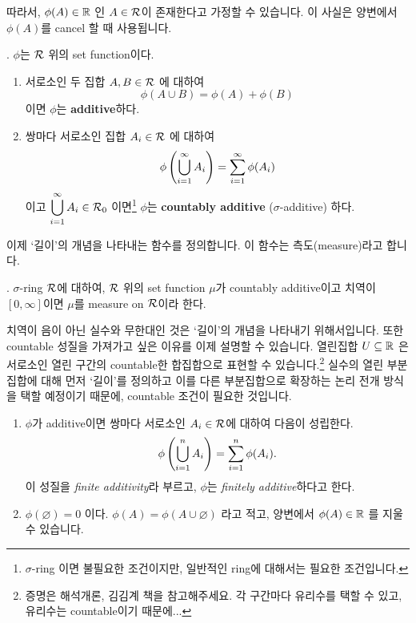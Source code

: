 따라서, \(\phi(A) \in \mathbb{R}\) 인 \(A \in \mathcal{R}\)이 존재한다고 가정할 수 있습니다. 이 사실은 양변에서 \(\phi(A)\)를 cancel 할 때 사용됩니다.

. \(\phi\)는 \(\mathcal{R}\) 위의 set function이다.
\begin{enumerate}
    \item 서로소인 두 집합 \(A, B \in \mathcal{R}\) 에 대하여
          \[
              \phi(A\cup B) = \phi(A) + \phi(B)
          \]
          이면 \(\phi\)는 \textbf{additive}하다.

    \item 쌍마다 서로소인 집합 \(A_i \in \mathcal{R}\) 에 대하여
          \[
              \phi\left( \bigcup_{i=1}^\infty A_i \right) = \sum_{i=1}^\infty \phi(A_i)
          \]
          이고 \(\displaystyle \bigcup_{i=1}^\infty A_i \in \mathcal{R}_0\) 이면\footnote{\(\sigma\)-ring 이면 불필요한 조건이지만, 일반적인 ring에 대해서는 필요한 조건입니다.} \(\phi\)는 \textbf{countably additive} (\(\sigma\)-additive) 하다.
\end{enumerate}

이제 `길이'의 개념을 나타내는 함수를 정의합니다. 이 함수는 측도(measure)라고 합니다.

.  \(\sigma\)-ring \(\mathcal{R}\)에 대하여, \(\mathcal{R}\) 위의 set function \(\mu\)가 countably additive이고 치역이 \([0, \infty]\)이면 \(\mu\)를 measure on \(\mathcal{R}\)이라 한다.

치역이 음이 아닌 실수와 무한대인 것은 `길이'의 개념을 나타내기 위해서입니다. 또한 countable 성질을 가져가고 싶은 이유를 이제 설명할 수 있습니다. 열린집합 \(U \subseteq \mathbb{R}\) 은 서로소인 열린 구간의 countable한 합집합으로 표현할 수 있습니다.\footnote{증명은 해석개론, 김김계 책을 참고해주세요. 각 구간마다 유리수를 택할 수 있고, 유리수는 countable이기 때문에...} 실수의 열린 부분집합에 대해 먼저 `길이'를 정의하고 이를 다른 부분집합으로 확장하는 논리 전개 방식을 택할 예정이기 때문에, countable 조건이 필요한 것입니다.

\medskip

\rmk
\begin{enumerate}
    \item \(\phi\)가 additive이면 쌍마다 서로소인 \(A_i \in \mathcal{R}\)에 대하여 다음이 성립한다.
          \[
              \phi\left( \bigcup_{i=1}^n A_i \right) = \sum_{i=1}^n \phi(A_i).
          \]
          이 성질을 \textit{finite additivity}라 부르고, \(\phi\)는 \textit{finitely additive}하다고 한다.

    \item \(\phi(\varnothing) = 0\) 이다. \(\phi(A) = \phi(A \cup \varnothing)\) 라고 적고, 양변에서 \(\phi(A) \in \mathbb{R}\) 를 지울 수 있습니다.
\end{enumerate}

